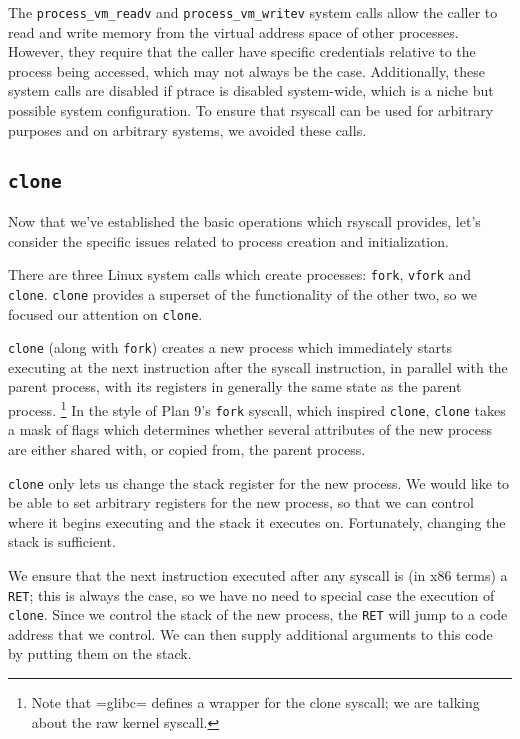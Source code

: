 \documentclass{acmart}
\begin{document}
The \verb|process_vm_readv| and \verb|process_vm_writev| system calls
allow the caller to read and write memory from the virtual address space of other processes.
However, they require that the caller have specific credentials relative to the process being accessed,
which may not always be the case.
Additionally, these system calls are disabled if ptrace is disabled system-wide,
which is a niche but possible system configuration.
To ensure that rsyscall can be used for arbitrary purposes and on arbitrary systems, we avoided these calls.
\subsection{\texttt{clone}}\label{clone}
Now that we've established the basic operations which rsyscall provides,
let's consider the specific issues related to process creation and initialization.

There are three Linux system calls which create processes:
\texttt{fork}, \texttt{vfork} and \texttt{clone}.
\texttt{clone} provides a superset of the functionality of the other two,
so we focused our attention on \texttt{clone}.

\texttt{clone} (along with \texttt{fork}) creates a new process
which immediately starts executing at the next instruction after the syscall instruction,
in parallel with the parent process,
with its registers in generally the same state as the parent process.
\footnote{Note that =glibc= defines a wrapper for the clone syscall;
we are talking about the raw kernel syscall.}
In the style of Plan 9's \texttt{fork} syscall\cite{rfork}, which inspired \texttt{clone},
\texttt{clone} takes a mask of flags which determines whether several attributes of the new process
are either shared with, or copied from, the parent process.

\texttt{clone} only lets us change the stack register for the new process.
We would like to be able to set arbitrary registers for the new process,
so that we can control where it begins executing and the stack it executes on.
Fortunately, changing the stack is sufficient.

We ensure that the next instruction executed after any syscall
is (in x86 terms) a \texttt{RET};
this is always the case, so we have no need to special case the execution of \texttt{clone}.
Since we control the stack of the new process,
the \texttt{RET} will jump to a code address that we control.
We can then supply additional arguments to this code
by putting them on the stack.
\end{document}
